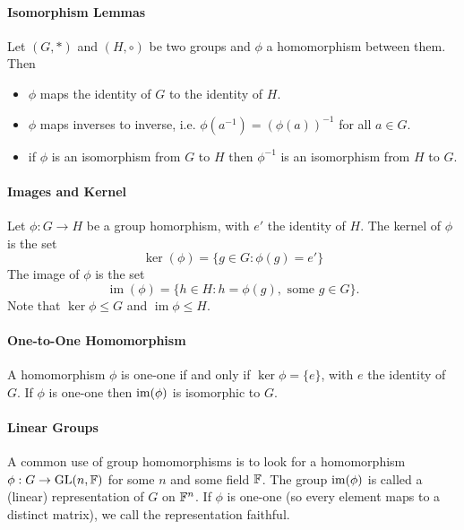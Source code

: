\paragraph{Isomorphism Lemmas}
Let \((G, *)\) and \((H, \circ)\) be two groups and \(\phi\) a homomorphism between them. Then
\begin{itemize}
    \item \(\phi\) maps the identity of \(G\) to the identity of \(H\).
    \item \(\phi\) maps inverses to inverse, i.e. \(\phi(a^{-1}) = (\phi(a))^{-1}\) for all \(a \in G\).
    \item if \(\phi\) is an isomorphism from \(G\) to \(H\) then \(\phi^{-1}\) is an isomorphism from \(H\) to \(G\).
\end{itemize}

\paragraph{Images and Kernel}
Let \(\phi: G \to H\) be a group homorphism, with \(e'\) the identity of \(H\).
The kernel of \(\phi\) is the set
\[\ker(\phi) = \{g \in G: \phi(g) = e'\}\]
The image of \(\phi\) is the set
\[\operatorname{im}(\phi) = \{h \in H: h = \phi(g), \text{ some } g \in G\}.\]
Note that \(\ker\phi \leq G\) and \(\operatorname{im}\phi \leq H\).

\paragraph{One-to-One Homomorphism}
A homomorphism \(\phi\) is one-one if and only if \(\ker\phi = \{e\}\), with \(e\) the identity of \(G\).
If \(\phi\) is one-one then \(\operatorname{im}(\phi)\) is isomorphic to \(G\).

\paragraph{Linear Groups}
A common use of group homomorphisms is to look for a homomorphism \(\phi: G \to \operatorname{GL}(n,\mathbb{F})\) for some \(n\) and some field \(\mathbb{F}\). The group \(\operatorname{im}(\phi)\) is called a (linear) representation of \(G\) on \(\mathbb{F}^n\). If \(\phi\) is one-one (so every element maps to a distinct matrix), we call the representation faithful.